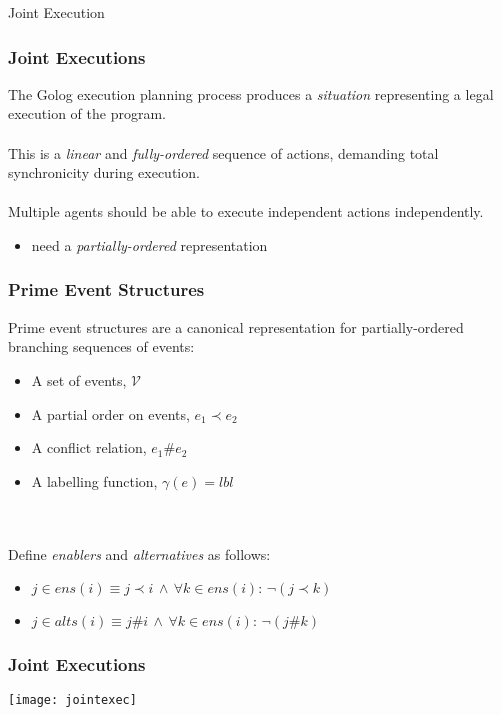 \documentclass{beamer}
\begin{document}
\begin{frame}
\centering \large Joint Execution\\
\end{frame}


\begin{frame}
\frametitle{Joint Executions}
The Golog execution planning process produces a \emph{situation} representing
a legal execution of the program.
\ \\
\ \\
This is a \emph{linear} and \emph{fully-ordered} sequence of actions, 
demanding total synchronicity during execution.
\ \\
\ \\
Multiple agents should be able to execute independent actions independently.
\begin{itemize}
\item need a \emph{partially-ordered} representation
\end{itemize}
\end{frame}

\begin{frame}
\frametitle{Prime Event Structures}
Prime event structures are a canonical representation for partially-ordered
branching sequences of events:
\begin{itemize}
\item A set of events, $\mathcal{V}$
\item A partial order on events, $e_1 \prec e_2$
\item A conflict relation, $e_1 \# e_2$
\item A labelling function, $\gamma(e) = lbl$
\end{itemize}
\ \\
\ \\
Define \emph{enablers} and \emph{alternatives} as follows:
\begin{itemize}
\item $j\in ens(i)\equiv j\prec i\,\wedge\,\forall k\in ens(i):\,\neg(j\prec k)$
\item $j\in alts(i)\equiv j \# i\,\wedge\,\forall k\in ens(i):\,\neg(j \# k)$
\end{itemize}
\end{frame}

\begin{frame}
\frametitle{Joint Executions}
\begin{center}
  \texttt{[image: jointexec]}
\end{center}
\end{frame}
\end{document}
